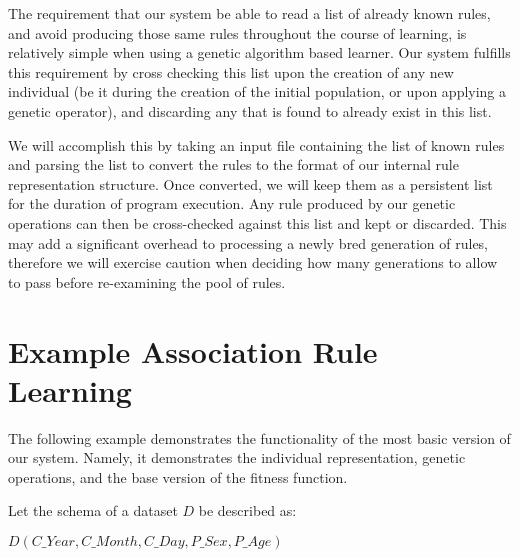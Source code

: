 \documentclass{amsart}
\theoremstyle{definition}
\theoremstyle{remark}
\numberwithin{equation}{section}
\begin{document}
The requirement that our system be able to read a list of already known rules, and avoid producing those same rules throughout the course of learning, is relatively simple when using a genetic algorithm based learner. Our system fulfills this requirement by cross checking this list upon the creation of any new individual (be it during the creation of the initial population, or upon applying a genetic operator), and discarding any that is found to already exist in this list. 

We will accomplish this by taking an input file containing the list of known rules and parsing the list to convert the rules to the format of our internal rule representation structure. Once converted, we will keep them as a persistent list for the duration of program execution. Any rule produced by our genetic operations can then be cross-checked against this list and kept or discarded. This may add a significant overhead to processing a newly bred generation of rules, therefore we will exercise caution when deciding how many generations to allow to pass before re-examining the pool of rules. 

\section{Example Association Rule Learning}

The following example demonstrates the functionality of the most basic version of our system. Namely, it demonstrates the individual representation, genetic operations, and the base version of the fitness function.\newline

Let the schema of a dataset $D$ be described as: \newline

$D(C\_Year,C\_Month,C\_Day, P\_Sex, P\_Age)$\newline
\end{document}

